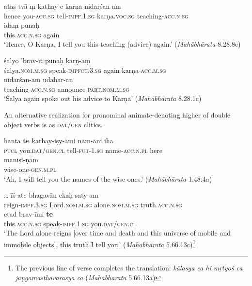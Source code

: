 \documentclass[output=paper,
modfonts
]{LSP/langsci}
\begin{document}
\begin{exe}
\ex\label{ex:bcd}
\begin{xlist}
\ex\label{ex:atas}\gll atas tvā-ṃ  kathay-e karṇa nidarśan-am \\
hence you-\textsc{acc.sg} tell-\textsc{impf.1.sg} karṇa.\textsc{voc.sg} teaching-\textsc{acc.n.sg} \\

\gll idaṃ punaḥ \\
this.\textsc{acc.n.sg} again  \\
\glt `Hence, O Karṇa, I tell you this teaching (advice) again.' (\textit{Mahābhārata} 8.28.8e)

\ex\label{ex:salyo}\gll śalyo 'brav-īt punaḥ karṇ-aṃ \\
śalya.\textsc{nom.m.sg} speak-\textsc{impfct.3.sg} again karṇa-\textsc{acc.m.sg} \\

\gll nidarśan-am udāhar-an \\  
teaching-\textsc{acc.n.sg} announce-\textsc{part.nom.m.sg}  \\
\glt `Śalya again spoke out  his advice to Karṇa' (\textit{Mahābhārata} 8.28.1c)
\end{xlist}
\end{exe}

An alternative realization for pronominal  animate-denoting higher  of double object verbs is as \textsc{dat/gen} clitics. 


\begin{exe}
\ex\label{nonergdat}
\begin{xlist}
\ex\label{ex:hanta}\gll hanta \textbf{te} kathay-iṣy-āmi nām-āni iha \\
\textsc{ptcl}  you.\textsc{dat/gen.cl} tell-\textsc{fut-1.sg}  name-\textsc{acc.n.pl} here  \\

\gll manīṣi-ṇām \\ 
wise-one-\textsc{gen.m.pl} \\
\glt `Ah, I will tell you the names of the wise ones.' (\textit{Mahābhārata} 1.48.4a)

\ex\label{ex:isate}\gll \dots{} īś-ate bhagavān ekaḥ saty-am \\
{} reign-\textsc{impf.3.sg} Lord.\textsc{nom.m.sg} alone.\textsc{nom.m.sg} truth.\textsc{acc.n.sg} \\

\gll etad brav-īmi \textbf{te} \\
this.\textsc{acc.n.sg} speak-\textsc{impf.1.sg} you.\textsc{dat/gen.cl} \\
\glt `The Lord alone reigns [over time and death and this universe of mobile and immobile objects], this truth I tell you.' (\textit{Mahābhārata} 5.66.13c)\footnote{The previous line of verse completes the translation: \textit{kālasya ca hi mṛtyoś ca jaṇgamasthāvarasya ca}  (\textit{Mahābhārata} 5.66.13a)}
\end{xlist}
\end{exe} 
\end{document}

